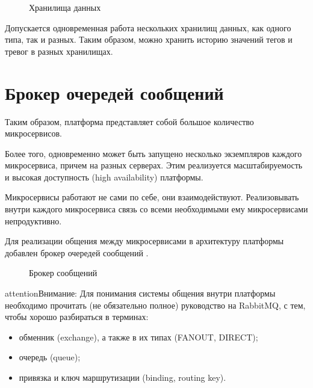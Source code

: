 \documentclass[a4paper,10pt,russian]{sphinxmanual}
\begin{document}
\begin{figure}[htbp]
\centering
\capstart

\noindent{}
\caption{Хранилища данных}\label{\detokenize{architecture:id28}}\end{figure}

\sphinxAtStartPar
Допускается одновременная работа нескольких хранилищ данных, как одного типа,
так и разных. Таким образом, можно хранить историю значений тегов и тревог
в разных хранилищах.


\section{Брокер очередей сообщений}
\label{\detokenize{architecture:id17}}
\sphinxAtStartPar
Таким образом, платформа представляет собой большое количество микросервисов.

\sphinxAtStartPar
Более того, одновременно может быть запущено несколько экземпляров каждого
микросервиса, причем на разных серверах. Этим реализуется масштабируемость
и высокая доступность (high availability) платформы.

\sphinxAtStartPar
Микросервисы работают не сами по себе, они взаимодействуют. Реализовывать
внутри каждого микросервиса связь со всеми необходимыми ему микросервисами \sphinxhyphen{}
непродуктивно.

\sphinxAtStartPar
Для реализации общения между микросервисами в архитектуру платформы добавлен
брокер очередей сообщений \sphinxhyphen{} .

\begin{figure}[htbp]
\centering
\capstart

\noindent{}
\caption{Брокер сообщений}\label{\detokenize{architecture:id29}}\end{figure}

\begin{sphinxadmonition}{attention}{Внимание:}
\sphinxAtStartPar
Для понимания системы общения внутри платформы необходимо прочитать
(не обязательно полное) руководство на RabbitMQ, с тем, чтобы хорошо
разбираться в терминах:
\begin{itemize}
\item {}
\sphinxAtStartPar
обменник (exchange), а также в их типах (FANOUT, DIRECT);

\item {}
\sphinxAtStartPar
очередь (queue);

\item {}
\sphinxAtStartPar
привязка и ключ маршрутизации (binding, routing key).

\end{itemize}
\end{sphinxadmonition}
\end{document}
